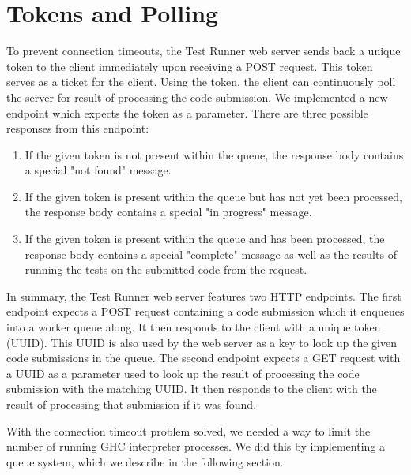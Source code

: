 \section{Tokens and Polling}
To prevent connection timeouts, the Test Runner web server sends back a unique token to the client immediately upon receiving a POST request.
This token serves as a ticket for the client.
Using the token, the client can continuously poll the server for result of processing the code submission.
We implemented a new endpoint which expects the token as a parameter.
There are three possible responses from this endpoint:
\begin{enumerate}
    \item If the given token is not present within the queue, the response body contains a special "not found" message.
    \item If the given token is present within the queue but has not yet been processed, the response body contains a special "in progress" message.
    \item If the given token is present within the queue and has been processed, the response body contains a special "complete" message as well as the results of running the tests on the submitted code from the request.
\end{enumerate}

In summary, the Test Runner web server features two HTTP endpoints.
The first endpoint expects a POST request containing a code submission which it enqueues into a worker queue along.
It then responds to the client with a unique token (UUID).
This UUID is also used by the web server as a key to look up the given code submissions in the queue.
The second endpoint expects a GET request with a UUID as a parameter used to look up the result of processing the code submission with the matching UUID.
It then responds to the client with the result of processing that submission if it was found.

With the connection timeout problem solved, we needed a way to limit the number of running GHC interpreter processes.
We did this by implementing a queue system, which we describe in the following section.